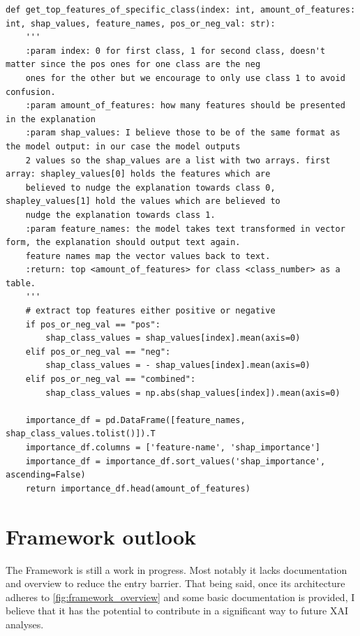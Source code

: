 \begin{lstlisting}
def get_top_features_of_specific_class(index: int, amount_of_features: int, shap_values, feature_names, pos_or_neg_val: str):
    '''
    :param index: 0 for first class, 1 for second class, doesn't matter since the pos ones for one class are the neg
    ones for the other but we encourage to only use class 1 to avoid confusion.
    :param amount_of_features: how many features should be presented in the explanation
    :param shap_values: I believe those to be of the same format as the model output: in our case the model outputs
    2 values so the shap_values are a list with two arrays. first array: shapley_values[0] holds the features which are
    believed to nudge the explanation towards class 0,     shapley_values[1] hold the values which are believed to
    nudge the explanation towards class 1.
    :param feature_names: the model takes text transformed in vector form, the explanation should output text again.
    feature names map the vector values back to text.
    :return: top <amount_of_features> for class <class_number> as a table.
    '''
    # extract top features either positive or negative
    if pos_or_neg_val == "pos":
        shap_class_values = shap_values[index].mean(axis=0)
    elif pos_or_neg_val == "neg":
        shap_class_values = - shap_values[index].mean(axis=0)
    elif pos_or_neg_val == "combined":
        shap_class_values = np.abs(shap_values[index]).mean(axis=0)

    importance_df = pd.DataFrame([feature_names, shap_class_values.tolist()]).T
    importance_df.columns = ['feature-name', 'shap_importance']
    importance_df = importance_df.sort_values('shap_importance', ascending=False)
    return importance_df.head(amount_of_features)
\end{lstlisting}


\section{Framework outlook}

The Framework is still a work in progress. Most notably it lacks documentation and overview to reduce the entry barrier. That being said, once its architecture adheres to \autoref{fig:framework_overview} and some basic documentation is provided, I believe that it has the potential to contribute in a significant way to future XAI analyses.